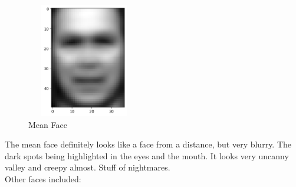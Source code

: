 \documentclass[10pt]{article}
\begin{document}
\begin{figure}[H]
  \centering
  \includegraphics[width=5cm, height=5cm]{images/4.1a_mean_face.png}
  \caption{Mean Face}
  \label{fig:mean-face}
\end{figure}

The mean face definitely looks like a face from a distance, but very blurry. The dark spots being highlighted in the eyes and the mouth. It looks very uncanny valley and creepy almost. Stuff of nightmares. \\

Other faces included:
\end{document}
